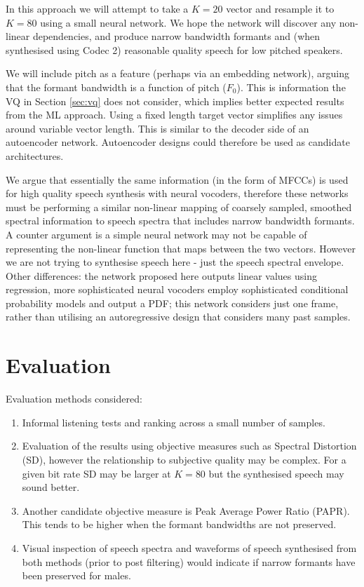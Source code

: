 \documentclass{article}
\begin{document}
In this approach we will attempt to take a $K=20$ vector and resample it to $K=80$ using a small neural network.   We hope the network will discover any non-linear dependencies, and produce narrow bandwidth formants and (when synthesised using Codec 2) reasonable quality speech for low pitched speakers.  

We will include pitch as a feature (perhaps via an embedding network), arguing that the formant bandwidth is a function of pitch ($F_0$).  This is information the VQ in Section \ref{sec:vq} does not consider, which implies better expected results from the ML approach. Using a fixed length target vector simplifies any issues around variable vector length.  This is similar to the decoder side of an autoencoder network.  Autoencoder designs could therefore be used as candidate architectures.

We argue that essentially the same information (in the form of MFCCs) is used for high quality speech synthesis with neural vocoders, therefore these networks must be performing a similar non-linear mapping of coarsely sampled, smoothed spectral information to speech spectra that includes narrow bandwidth formants.  A counter argument is a simple neural network may not be capable of representing the non-linear function that maps between the two vectors.  However we are not trying to synthesise speech here - just the speech spectral envelope.  Other differences: the network proposed here outputs linear values using regression, more sophisticated neural vocoders employ sophisticated conditional probability models and output a PDF; this network considers just one frame, rather than utilising an autoregressive design that considers many past samples.

\section{Evaluation}

Evaluation methods considered:
\begin{enumerate}
\item Informal listening tests and ranking across a small number of samples.
\item Evaluation of the results using objective measures such as Spectral Distortion (SD), however the relationship to subjective quality may be complex.  For a given bit rate SD may be larger at $K=80$ but the synthesised speech may sound better.
\item Another candidate objective measure is Peak Average Power Ratio (PAPR). This tends to be higher when the formant bandwidths are not preserved.
\item Visual inspection of speech spectra and waveforms of speech synthesised from both methods (prior to post filtering) would indicate if narrow formants have been preserved for males.
\end{enumerate}
	
\end{document}
